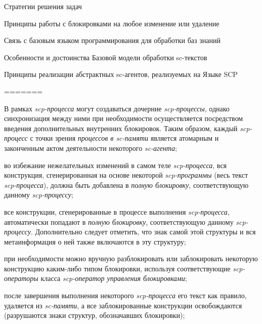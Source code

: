 \begin{frame}{Стратегии решения задач}
\begin{frame}{\large Принципы работы с блокировками на любое изменение или удаление}
\begin{frame}{Связь с базовым языком программирования для обработки баз
знаний}
\begin{frame}{Особенности и достоинства Базовой модели обработки sc-текстов}
\begin{frame}{\large Принципы реализации абстрактных sc-агентов, реализуемых на Языке SCP}
\begin{textitemize}
\end{textitemize}
=======
\begin{frame}{}
\begin{textitemize}
    \item В рамках \textit{scp-процесса} могут создаваться дочерние \textit{scp-процессы}, однако синхронизация между ними при необходимости осуществляется посредством введения дополнительных внутренних блокировок. Таким образом, каждый \textit{scp-процесс} с точки зрения \textit{процессов в sc-памяти} является атомарным и законченным актом деятельности некоторого \textit{sc-агента};
    \item во избежание нежелательных изменений в самом теле \textit{scp-процесса}, вся конструкция, сгенерированная на основе некоторой \textit{scp-программы} (весь текст \textit{scp-процесса}), должна быть добавлена в \textit{полную блокировку}, соответствующую данному \textit{scp-процессу};
\end{textitemize}
\end{frame}

\begin{frame}{}
\begin{textitemize}
\item все конструкции, сгенерированные в процессе выполнения \textit{scp-процесса}, автоматически попадают в \textit{полную 	блокировку}, соответствующую данному \textit{scp-процессу}. Дополнительно следует отметить, что знак самой этой структуры и вся метаинформация о ней также включаются в эту структуру;
\item при необходимости можно вручную разблокировать или заблокировать некоторую конструкцию каким-либо типом блокировки, используя соответствующие \textit{scp-операторы} класса \textit{scp-оператор управления блокировками};
\item после завершения выполнения некоторого \textit{scp-процесса} его текст как правило, удаляется из \textit{\mbox{sc-памяти}}, а все заблокированные конструкции освобождаются (разрушаются знаки структур, обозначавших блокировки);
\end{textitemize}
\end{frame}


\end{frame}
\end{frame}
\end{frame}
\end{frame}
\end{frame}
